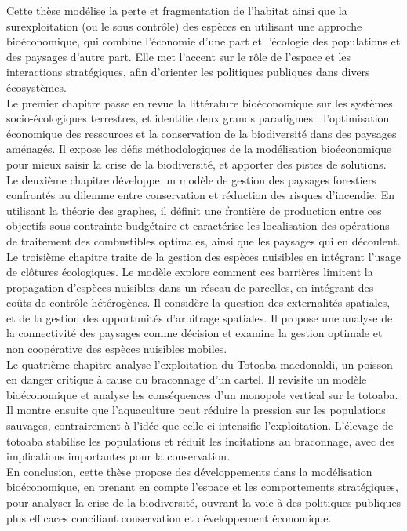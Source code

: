 {Cette thèse modélise la perte et fragmentation de l’habitat ainsi que la surexploitation (ou le sous contrôle) des espèces en utilisant une approche bioéconomique, qui combine l’économie d’une part et l’écologie des populations et des paysages d’autre part. Elle met l’accent sur le rôle de l’espace et les interactions stratégiques, afin d’orienter les politiques publiques dans divers écosystèmes.\\
Le premier chapitre passe en revue la littérature bioéconomique sur les systèmes socio-écologiques terrestres, et identifie deux grands paradigmes : l'optimisation économique des ressources et la conservation de la biodiversité dans des paysages aménagés. Il expose les défis méthodologiques de la modélisation bioéconomique pour mieux saisir la crise de la biodiversité, et apporter des pistes de solutions.\\
Le deuxième chapitre développe un modèle de gestion des paysages forestiers confrontés au dilemme entre conservation et réduction des risques d’incendie. En utilisant la théorie des graphes, il définit une frontière de production entre ces objectifs sous contrainte budgétaire et caractérise les localisation des opérations de traitement des combustibles optimales, ainsi que les paysages qui en découlent.\\
Le troisième chapitre traite de la gestion des espèces nuisibles en intégrant l’usage de clôtures écologiques. Le modèle explore comment ces barrières limitent la propagation d’espèces nuisibles dans un réseau de parcelles, en intégrant des coûts de contrôle hétérogènes. Il considère la question des externalités spatiales, et de la gestion des opportunités d’arbitrage spatiales. Il propose une analyse de la connectivité des paysages comme décision et examine la gestion optimale et non coopérative des espèces nuisibles mobiles. \\
Le quatrième chapitre analyse l’exploitation du Totoaba macdonaldi, un poisson en danger critique à cause du braconnage d’un cartel. Il revisite un modèle bioéconomique et analyse les conséquences d’un monopole vertical sur le totoaba. Il montre ensuite que l’aquaculture peut réduire la pression sur les populations sauvages, contrairement à l'idée que celle-ci intensifie l'exploitation. L’élevage de totoaba stabilise les populations et réduit les incitations au braconnage, avec des implications importantes pour la conservation.\\
En conclusion, cette thèse propose des développements dans la modélisation bioéconomique, en prenant en compte l’espace et les comportements stratégiques, pour analyser la crise de la biodiversité, ouvrant la voie à des politiques publiques plus efficaces conciliant conservation et développement économique.
}															%

